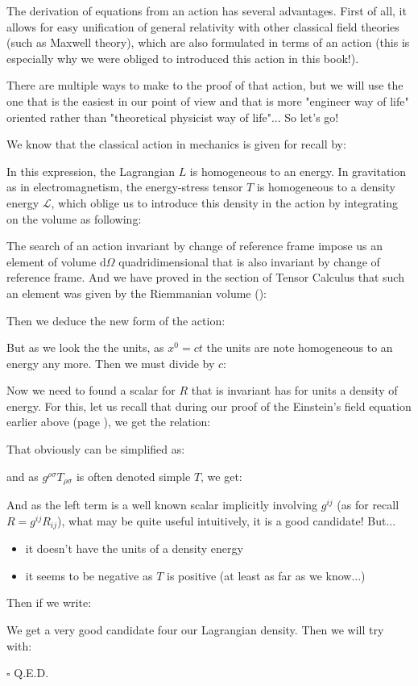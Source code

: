 	The derivation of equations from an action has several advantages. First of all, it allows for easy unification of general relativity with other classical field theories (such as Maxwell theory), which are also formulated in terms of an action (this is especially why we were obliged to introduced this action in this book!).
	
	There are multiple ways to make to the proof of that action, but we will use the one that is the easiest in our point of view and that is more "engineer way of life" oriented rather than "theoretical physicist way of life"... So let's go!
	\begin{dem}
	We know that the classical action in mechanics is given for recall by:
	
	In this expression, the Lagrangian $L$ is homogeneous to an energy. In gravitation as in electromagnetism, the energy-stress tensor $T$ is homogeneous to a density energy $\mathcal{L}$, which oblige us to introduce this density in the action by integrating on the volume as following:
	
	The search of an action invariant by change of reference frame impose us an element of volume $\mathrm{d}\Omega$ quadridimensional that is also invariant by change of reference frame. And we have proved in the section of Tensor Calculus that such an element was given by the Riemmanian volume ():
	
	Then we deduce the new form of the action:
	
	But as we look the the units, as $x^0=ct$ the units are note homogeneous to an energy any more. Then we must divide by $c$:
	
	Now we need to found a scalar for $R$ that is invariant has for units a density of energy. For this, let us recall that during our proof of the Einstein's field equation earlier above (page \pageref{einstein field equations}), we get the relation:
	
	That obviously can be simplified as:
	
	and as $g^{\rho\sigma}T_{\rho\sigma}$ is often denoted simple $T$, we get:
	
	And as the left term is a well known scalar implicitly involving $g^{ij}$ (as for recall $R=g^{ij}R_{ij}$), what may be quite useful intuitively, it is a good candidate! But...
	\begin{itemize}
		\item it doesn't have the units of a density energy
		\item it seems to be negative as $T$ is positive (at least as far as we know...)
	\end{itemize}
	Then if we write:
	
	We get a very good candidate four our Lagrangian density. Then we will try with:
	
	\begin{flushright}
		$\square$  Q.E.D.
	\end{flushright}
	\end{dem}
